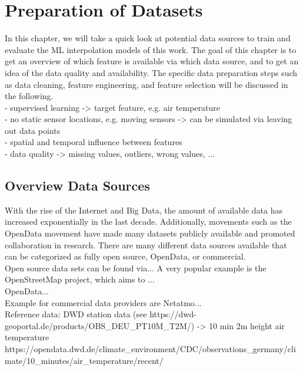 \chapter{Preparation of Datasets}
\label{chap:preparations data sets}

In this chapter, we will take a quick look at potential data sources to train and evaluate the ML interpolation models of this work. 
The goal of this chapter is to get an overview of which feature is available via which data source, and to get an idea of the data quality and availability. The specific data preparation steps such as data cleaning, feature engineering, and feature selection will be discussed in the following.\\
- supervised learning -> target feature, e.g. air temperature\\
- no static sensor locations, e.g. moving sensors -> can be simulated via leaving out data points\\
- spatial and temporal influence between features\\
- data quality -> missing values, outliers, wrong values, ...\\

\section{Overview Data Sources}

With the rise of the Internet and Big Data, the amount of available data has increased exponentially in the last decade. Additionally, movements such as the OpenData movement have made many datasets publicly available and promoted collaboration in research. There are many different data sources available that can be categorized as fully open source, OpenData, or commercial.\\
Open source data sets can be found via... A very popular example is the OpenStreetMap project, which aims to ...\\
OpenData...\\
Example for commercial data providers are Netatmo...\\

Reference data: DWD station data (see https://dwd-geoportal.de/products/OBS\_DEU\_PT10M\_T2M/) -> 10 min 2m height air temperature
https://opendata.dwd.de/climate\_environment/CDC/observations\_germany/climate/10\_minutes/air\_temperature/recent/


